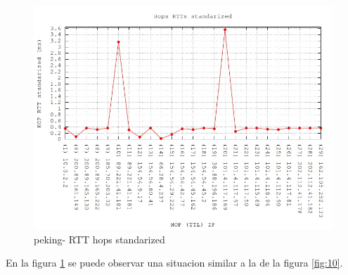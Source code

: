 \begin{figure}[!htbp]
  \centering
    \includegraphics[scale=0.6]{imagenes/peking-graficos/traceroute-peking-standarized.jpg}
  \caption{peking- RTT hops standarized}
  \label{fig:11}
\end{figure}

En la figura \ref{fig:11} se puede observar una situacion similar a la de la figura \ref{fig:10}.


